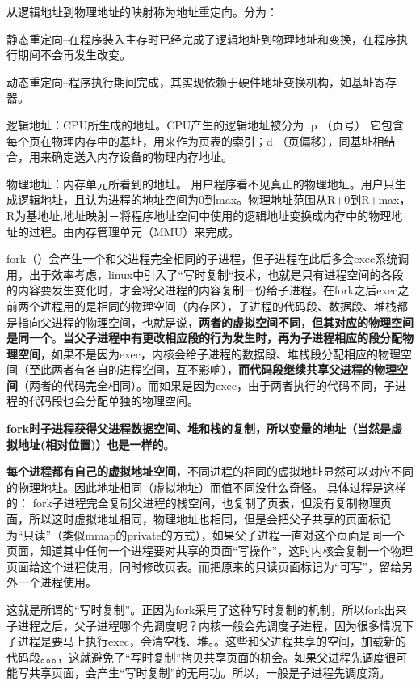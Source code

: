 \documentclass[UTF8,a4paper,12pt]{ctexbook}
\begin{document}
			从逻辑地址到物理地址的映射称为地址重定向。分为：
			
			静态重定向--在程序装入主存时已经完成了逻辑地址到物理地址和变换，在程序执行期间不会再发生改变。
			
			动态重定向--程序执行期间完成，其实现依赖于硬件地址变换机构，如基址寄存器。
			
			逻辑地址：CPU所生成的地址。CPU产生的逻辑地址被分为 :p （页号） 它包含每个页在物理内存中的基址，用来作为页表的索引；d （页偏移），同基址相结合，用来确定送入内存设备的物理内存地址。
			
			物理地址：内存单元所看到的地址。
			用户程序看不见真正的物理地址。用户只生成逻辑地址，且认为进程的地址空间为0到max。物理地址范围从R+0到R+max，R为基地址,地址映射－将程序地址空间中使用的逻辑地址变换成内存中的物理地址的过程。由内存管理单元（MMU）来完成。
			
			fork（）会产生一个和父进程完全相同的子进程，但子进程在此后多会exec系统调用，出于效率考虑，linux中引入了“写时复制“技术，也就是只有进程空间的各段的内容要发生变化时，才会将父进程的内容复制一份给子进程。在fork之后exec之前两个进程用的是相同的物理空间（内存区），子进程的代码段、数据段、堆栈都是指向父进程的物理空间，也就是说，\textbf{两者的虚拟空间不同，但其对应的物理空间是同一个}。\textbf{当父子进程中有更改相应段的行为发生时，再为子进程相应的段分配物理空间}，如果不是因为exec，内核会给子进程的数据段、堆栈段分配相应的物理空间（至此两者有各自的进程空间，互不影响），\textbf{而代码段继续共享父进程的物理空间}（两者的代码完全相同）。而如果是因为exec，由于两者执行的代码不同，子进程的代码段也会分配单独的物理空间。
			
			\textbf{fork时子进程获得父进程数据空间、堆和栈的复制，所以变量的地址（当然是虚拟地址(相对位置)）也是一样的}。
			
			\textbf{每个进程都有自己的虚拟地址空间}，不同进程的相同的虚拟地址显然可以对应不同的物理地址。因此地址相同（虚拟地址）而值不同没什么奇怪。
			具体过程是这样的：
			fork子进程完全复制父进程的栈空间，也复制了页表，但没有复制物理页面，所以这时虚拟地址相同，物理地址也相同，但是会把父子共享的页面标记为“只读”（类似mmap的private的方式），如果父子进程一直对这个页面是同一个页面，知道其中任何一个进程要对共享的页面“写操作”，这时内核会复制一个物理页面给这个进程使用，同时修改页表。而把原来的只读页面标记为“可写”，留给另外一个进程使用。
			
			这就是所谓的“写时复制”。正因为fork采用了这种写时复制的机制，所以fork出来子进程之后，父子进程哪个先调度呢？内核一般会先调度子进程，因为很多情况下子进程是要马上执行exec，会清空栈、堆。。这些和父进程共享的空间，加载新的代码段。。。，这就避免了“写时复制”拷贝共享页面的机会。如果父进程先调度很可能写共享页面，会产生“写时复制”的无用功。所以，一般是子进程先调度滴。
			
\end{document}
